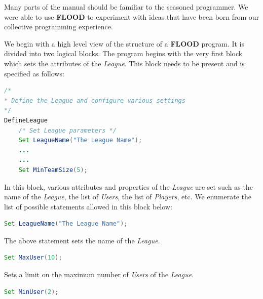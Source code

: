 \documentclass[12pt]{report}
\begin{document}
Many parts of the manual should be familiar to the seasoned programmer. We were able to use \textbf{FLOOD} to experiment with ideas that have been born from our collective programming experience. 

We begin with a high level view of the structure of a \textbf{FLOOD} program. It is divided into two logical blocks. The program begins with the very first block which sets the attributes of the \textit{League}. This block needs to be present and is specified as follows:

\begin{singlespace}
\begin{lstlisting}[language=Java,label=some-code,caption={\texttt{DefineLeague}}]
/*
* Define the League and configure various settings
*/
DefineLeague
	/* Set League parameters */
	Set LeagueName("The League Name");
	...
	...
	Set MinTeamSize(5);
\end{lstlisting}
\end{singlespace}

In this block, various attributes and properties of the \textit{League} are set such as the name of the \textit{League}, the list of \textit{Users}, the list of \textit{Players}, etc. We enumerate the list of possible statements allowed in this block below:

\begin{singlespace}
\begin{lstlisting}[language=Java,label=some-code,caption={Setting league name.}]
Set LeagueName("The League Name");
\end{lstlisting}
\end{singlespace}

The above statement sets the name of the \textit{League}.

\begin{singlespace}
\begin{lstlisting}[language=Java,label=some-code,caption={Setting maximun number of \texttt{Users}.}]
Set MaxUser(10);
\end{lstlisting}
\end{singlespace}

Sets a limit on the maximum number of \textit{Users} of the \textit{League}.

\begin{singlespace}
\begin{lstlisting}[language=Java,label=some-code,caption={Setting minimum number of \texttt{Users}.}]
Set MinUser(2);
\end{lstlisting}
\end{singlespace}
\end{document}
